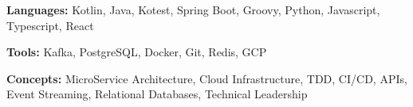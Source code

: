 \documentclass[letterpaper,11pt]{article}
\begin{document}

\begin{myitemize}

\item \textbf{Languages: }{\normalsize Kotlin, Java, Kotest, Spring Boot, Groovy, Python, Javascript, Typescript, React}
\item \textbf{Tools: } {\normalsize Kafka, PostgreSQL, Docker, Git, Redis, GCP}
\item \textbf{Concepts: } {\normalsize MicroService Architecture, Cloud Infrastructure, TDD, CI/CD, APIs, Event Streaming, Relational Databases, Technical Leadership}

\end{myitemize}


\end{document}
